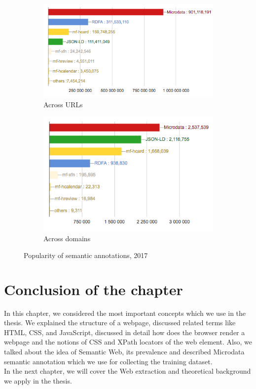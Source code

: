 \begin{figure}[h]
\begin{subfigure}{.5\textwidth}
  \centering
  \includegraphics[width=1.\linewidth]{figures02/urls_meta}
  \caption{Across URLs}
\end{subfigure} 
\begin{subfigure}{.5\textwidth}
  \centering
  \includegraphics[width=.8\linewidth]{figures02/domain_meta}
  \caption{Across domains}
\end{subfigure}
\caption{Popularity of semantic annotations, 2017}
\label{fig:markup}
\end{figure}




\section*{Conclusion of the chapter}
In this chapter, we considered the most important concepts which we use in the thesis. We explained the structure of a webpage, discussed related terms like HTML, CSS, and JavaScript, discussed in detail how does the browser render a webpage and the notions of CSS and XPath locators of the web element. Also, we talked about the idea of Semantic Web, its prevalence and described Microdata semantic annotation which we use for collecting the training dataset.\\

In the next chapter, we will cover the Web extraction and theoretical background we apply in the thesis. 